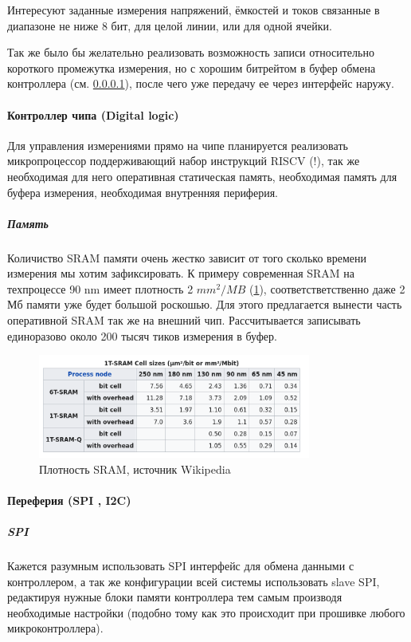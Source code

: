 \documentclass[a4paper,12pt]{article} %
\begin{document}
Интересуют заданные измерения напряжений, ёмкостей и токов связанные в диапазоне не ниже 8 бит, для целой линии, или для одной ячейки.

Так же было бы желательно реализовать возможность записи относительно короткого промежутка измерения, но с хорошим битрейтом в буфер обмена контроллера (см. \ref{digital}), после чего уже передачу ее через интерфейс наружу.

\paragraph{ Контроллер чипа (Digital logic)} \label{digital}

Для управления измерениями прямо на чипе планируется реализовать микропроцессор поддерживающий набор инструкций RISCV (!), так же необходимая для него оперативная статическая память, необходимая память для буфера измерения, необходимая внутренняя периферия.

\subparagraph{Память} Количиство SRAM памяти очень жестко зависит от того сколько времени измерения мы хотим зафиксировать. К примеру современная SRAM на техпроцессе 90 nm имеет плотность 2 $mm^2/MB $ (\ref{pic:sram}), соответстветственно даже 2 Мб памяти уже будет большой роскошью. Для этого предлагается вынести часть оперативной SRAM так же на внешний чип. Рассчитывается записывать единоразово около 200 тысяч тиков измерения в буфер.

\begin{figure}[h]
\centering
\includegraphics[width=0.8\textwidth]{sram.png}
\caption{ Плотность SRAM, источник Wikipedia}\label{pic:sram}
\end{figure}



\paragraph{ Переферия  (SPI , I2C)}

\subparagraph{SPI} Кажется разумным использовать SPI интерфейс для обмена данными с контроллером, а так же конфигурации всей системы использовать slave SPI, редактируя нужные блоки памяти контроллера тем самым производя необходимые настройки (подобно тому как это происходит при прошивке любого микроконтроллера).
\end{document}
